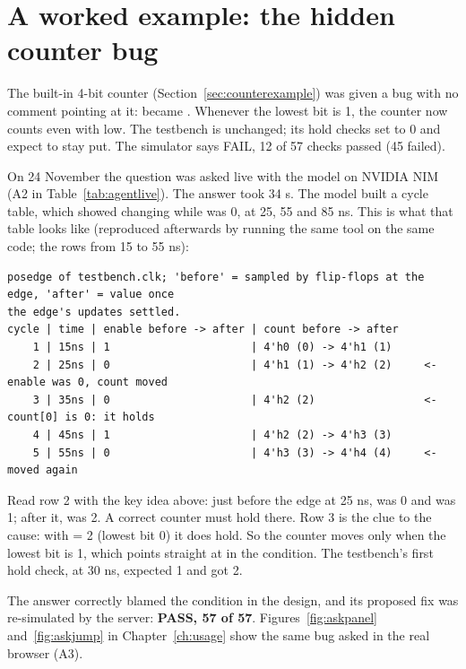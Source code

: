 \section{A worked example: the hidden counter bug}
\label{sec:agentexample}

The built-in 4-bit counter (Section~\ref{sec:counterexample}) was given a bug with no comment pointing at it:  became . Whenever the lowest bit is 1, the counter now counts even with  low. The testbench is unchanged; its hold checks set  to 0 and expect  to stay put. The simulator says FAIL, 12 of 57 checks passed (45 failed).

On 24 November the question was asked live with the model  on NVIDIA NIM (A2 in Table~\ref{tab:agentlive}). The answer took 34 s. The model built a cycle table, which showed  changing while  was 0, at 25, 55 and 85 ns. This is what that table looks like (reproduced afterwards by running the same tool on the same code; the rows from 15 to 55 ns):

\begin{lstlisting}[style=plain]
posedge of testbench.clk; 'before' = sampled by flip-flops at the edge, 'after' = value once
the edge's updates settled.
cycle | time | enable before -> after | count before -> after
    1 | 15ns | 1                      | 4'h0 (0) -> 4'h1 (1)
    2 | 25ns | 0                      | 4'h1 (1) -> 4'h2 (2)     <- enable was 0, count moved
    3 | 35ns | 0                      | 4'h2 (2)                 <- count[0] is 0: it holds
    4 | 45ns | 1                      | 4'h2 (2) -> 4'h3 (3)
    5 | 55ns | 0                      | 4'h3 (3) -> 4'h4 (4)     <- moved again
\end{lstlisting}

Read row 2 with the key idea above: just before the edge at 25 ns,  was 0 and  was 1; after it,  was 2. A correct counter must hold there. Row 3 is the clue to the cause: with  = 2 (lowest bit 0) it does hold. So the counter moves only when the lowest bit is 1, which points straight at  in the condition. The testbench's first hold check, at 30 ns, expected 1 and got 2.

The answer correctly blamed the condition in the design, and its proposed fix was re-simulated by the server: \textbf{PASS, 57 of 57}. Figures~\ref{fig:askpanel} and~\ref{fig:askjump} in Chapter~\ref{ch:usage} show the same bug asked in the real browser (A3).

